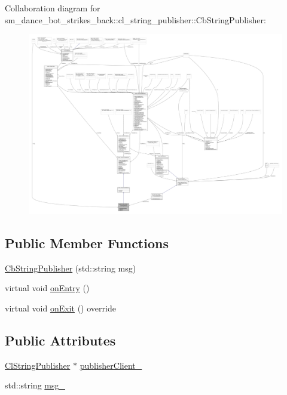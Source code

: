 Collaboration diagram for sm\+\_\+dance\+\_\+bot\+\_\+strikes\+\_\+back\+:\+:cl\+\_\+string\+\_\+publisher\+:\+:Cb\+String\+Publisher\+:
\nopagebreak
\begin{figure}[H]
\begin{center}
\leavevmode
\includegraphics[width=350pt]{classsm__dance__bot__strikes__back_1_1cl__string__publisher_1_1CbStringPublisher__coll__graph}
\end{center}
\end{figure}
\subsection*{Public Member Functions}
\begin{DoxyCompactItemize}
\item 
\hyperlink{classsm__dance__bot__strikes__back_1_1cl__string__publisher_1_1CbStringPublisher_a845fc8ce98f3b9d3bde64119af338068}{Cb\+String\+Publisher} (std\+::string msg)
\item 
virtual void \hyperlink{classsm__dance__bot__strikes__back_1_1cl__string__publisher_1_1CbStringPublisher_a2c3963143fe180a5e5f939362857d2e0}{on\+Entry} ()
\item 
virtual void \hyperlink{classsm__dance__bot__strikes__back_1_1cl__string__publisher_1_1CbStringPublisher_ae4aa02553119822c583bb2abb44c810c}{on\+Exit} () override
\end{DoxyCompactItemize}
\subsection*{Public Attributes}
\begin{DoxyCompactItemize}
\item 
\hyperlink{classsm__dance__bot__strikes__back_1_1cl__string__publisher_1_1ClStringPublisher}{Cl\+String\+Publisher} $\ast$ \hyperlink{classsm__dance__bot__strikes__back_1_1cl__string__publisher_1_1CbStringPublisher_afdbdb3c725b013af9f30fc04d7ab458b}{publisher\+Client\+\_\+}
\item 
std\+::string \hyperlink{classsm__dance__bot__strikes__back_1_1cl__string__publisher_1_1CbStringPublisher_aff05ac35bd920ef24fd9b6464fe83eae}{msg\+\_\+}
\end{DoxyCompactItemize}
